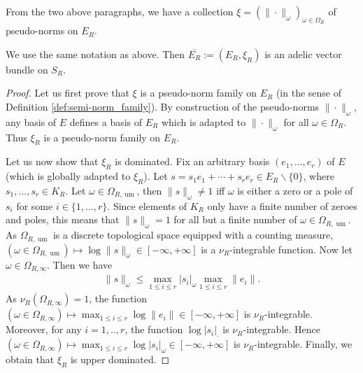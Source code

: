 \documentclass [11pt,reqno]{amsart}
\newcommand{\1}{\mathmybb{1}}
\def\um{\operatorname{um}}
\def\setminus{\smallsetminus}
\begin{document}
From the two above paragraphs, we have a collection $\xi=(\|\cdot\|_{\omega})_{\omega\in \Omega_{R}}$ of pseudo-norms on $E_R$. 

\begin{proposition}
\label{prop:example_avb_Nevanlinna}
We use the same notation as above. Then $\overline{E_R}:=(E_R,\xi_R)$ is an adelic vector bundle on $S_R$.
\end{proposition}

\begin{proof}
Let us first prove that $\xi$ is a pseudo-norm family on $E_R$ (in the sense of Definition \ref{def:semi-norm_family}). By construction of the pseudo-norms $\|\cdot\|_{\omega}$, any basis of $E$ defines a basis of $E_R$ which is adapted to $\|\cdot\|_{\omega}$ for all $\omega\in\Omega_{R}$. Thus $\xi_R$ is a pseudo-norm family on $E_R$. 

Let us now show that $\xi_R$ is dominated. Fix an arbitrary basis $(e_1,...,e_r)$ of $E$ (which is globally adapted to $\xi_R$). Let $s=s_1e_1 + \cdots + s_re_r \in E_R\setminus\{0\}$, where $s_1,...,s_r\in K_{R}$. Let $\omega\in \Omega_{R,\um}$, then $\|s\|_{\omega}\neq 1$ iff $\omega$ is either a zero or a pole of $s_i$ for some $i\in \{1,...,r\}$. Since elements of $K_R$ only have a finite number of zeroes and poles, this means that $\|s\|_{\omega}=1$ for all but a finite number of $\omega\in\Omega_{R,\um}$. As $\Omega_{R,\um}$ is a discrete topological space equipped with a counting measure, $(\omega\in \Omega_{R,\um}) \mapsto \log\|s\|_{\omega}\in[-\infty,+\infty]$ is a $\nu_R$-integrable function. Now let $\omega\in \Omega_{R,\infty}$. Then we have 
\begin{align*}
\|s\|_{\omega} \leq \displaystyle\max_{1\leq i \leq r} |s_i|_{\omega} \max_{1\leq i \leq r} \|e_i\|.
\end{align*}
As $\nu_{R}(\Omega_{R,\infty}) = 1$, the function $(\omega\in \Omega_{R,\infty}) \mapsto \max_{1\leq i \leq r}\log\|e_i\|\in [-\infty,+\infty]$ is $\nu_R$-integrable. Moreover, for any $i=1,..,r$, the function $\log|s_i|_{\cdot}$ is $\nu_R$-integrable. Hence $(\omega\in \Omega_{R,\infty}) \mapsto \max_{1\leq i \leq r}\log|s_i|_{\omega}\in[-\infty,+\infty]$ is $\nu_R$-integrable. Finally, we obtain that $\xi_R$ is upper dominated. 


\end{proof}
\end{document}

